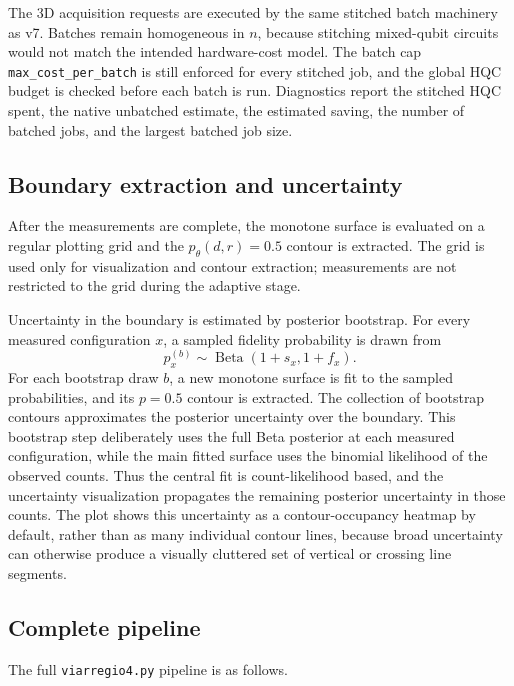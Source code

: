 The 3D acquisition requests are executed by the same stitched batch machinery
as v7.  Batches remain homogeneous in \(n\), because stitching mixed-qubit
circuits would not match the intended hardware-cost model.  The batch cap
\texttt{max\_cost\_per\_batch} is still enforced for every stitched job, and the
global HQC budget is checked before each batch is run.  Diagnostics report the
stitched HQC spent, the native unbatched estimate, the estimated saving, the
number of batched jobs, and the largest batched job size.

\subsection{Boundary extraction and uncertainty}

After the measurements are complete, the monotone surface is evaluated on a
regular plotting grid and the \(p_\theta(d,r)=0.5\) contour is extracted.  The
grid is used only for visualization and contour extraction; measurements are
not restricted to the grid during the adaptive stage.

Uncertainty in the boundary is estimated by posterior bootstrap.  For every
measured configuration \(x\), a sampled fidelity probability is drawn from
\[
    p_x^{(b)}
    \sim
    \operatorname{Beta}(1+s_x,1+f_x).
\]
For each bootstrap draw \(b\), a new monotone surface is fit to the sampled
probabilities, and its \(p=0.5\) contour is extracted.  The collection of
bootstrap contours approximates the posterior uncertainty over the boundary.
This bootstrap step deliberately uses the full Beta posterior at each measured
configuration, while the main fitted surface uses the binomial likelihood of
the observed counts.  Thus the central fit is count-likelihood based, and the
uncertainty visualization propagates the remaining posterior uncertainty in
those counts.
The plot shows this uncertainty as a contour-occupancy heatmap by default,
rather than as many individual contour lines, because broad uncertainty can
otherwise produce a visually cluttered set of vertical or crossing line
segments.

\subsection{Complete pipeline}

The full \texttt{viarregio4.py} pipeline is as follows.

